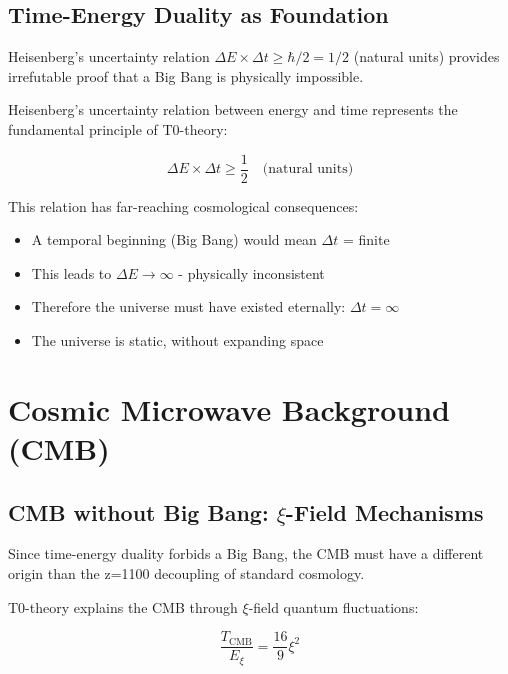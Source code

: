 \documentclass[12pt,a4paper]{article}
\begin{document}
	\subsection{Time-Energy Duality as Foundation}
	
	\begin{revolutionary}
		Heisenberg's uncertainty relation $\Delta E \times \Delta t \geq \hbar/2 = 1/2$ (natural units) provides irrefutable proof that a Big Bang is physically impossible.
	\end{revolutionary}
	
	Heisenberg's uncertainty relation between energy and time represents the fundamental principle of T0-theory:
	
	\begin{equation}
		\Delta E \times \Delta t \geq \frac{1}{2} \quad \text{(natural units)}
	\end{equation}
	
	This relation has far-reaching cosmological consequences:
	\begin{itemize}
		\item A temporal beginning (Big Bang) would mean $\Delta t$ = finite
		\item This leads to $\Delta E \to \infty$ - physically inconsistent
		\item Therefore the universe must have existed eternally: $\Delta t = \infty$
		\item The universe is static, without expanding space
	\end{itemize}
	

	\section{Cosmic Microwave Background (CMB)}
	
	\subsection{CMB without Big Bang: $\xi$-Field Mechanisms}
	
	\begin{revolutionary}
		Since time-energy duality forbids a Big Bang, the CMB must have a different origin than the z=1100 decoupling of standard cosmology.
	\end{revolutionary}
	
	T0-theory explains the CMB through $\xi$-field quantum fluctuations:
	
	\begin{equation}
		\frac{T_{\text{CMB}}}{E_\xi} = \frac{16}{9} \xi^2
	\end{equation}
	
\end{document}
